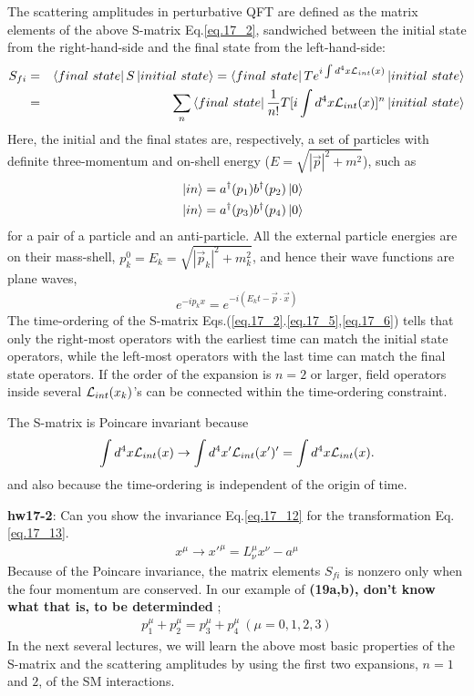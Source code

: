 \documentclass[12pt]{article}
\def\dgr{\dagger}
\begin{document}
  The scattering amplitudes in perturbative QFT are defined as the matrix
  elements of the above S-matrix Eq.\ref{eq.17_2}, sandwiched between the initial state from the right-hand-side and the final state from the left-hand-side:
\begin{eqnarray}
  S_{fi}
  &=& \bra{final~state} S \ket{initial~state}
  = \bra{final~state} T e^{ i\int d^4x {\cal L}_{int}(x) } \ket{initial~state} \\
  &=& \sum_n \bra{final~state} \frac{1}{n!}T[i\int d^4x {\cal L}_{int}(x)]^n \ket{initial~state} \label{eq.17_9}
\end{eqnarray}
  Here, the initial and the final states are, respectively, a set of
  particles with definite three-momentum and on-shell energy
  ($E = \sqrt{|{\vec p}|^2+m^2}$), such as
\begin{eqnarray}
  &&\ket {in}=a^\dgr(p_1) b^\dgr(p_2) \ket{0} \label{eq.17_10a} \\
  &&\ket {in}= a^\dgr(p_3) b^\dgr(p_4) \ket{0} \label{eq.17_10b} 
\end{eqnarray}
  for a pair of a particle and an anti-particle.  All the external particle
  energies are on their mass-shell, $p_k^0 = E_k = \sqrt{|{\vec p}_k|^2+m_k^2}$, and hence their wave functions are plane waves,
\begin{eqnarray}
  e^{ -ip_k x } = e^{ -i(E_k t - {\vec p}\cdot {\vec x}) } \label{eq.17_11}
\end{eqnarray}
  The time-ordering of the S-matrix Eqs.(\ref{eq.17_2}.\ref{eq.17_5},\ref{eq.17_6}) tells that only the right-most operators with the earliest time can match the initial state operators, while the left-most operators with the last time can match the final state operators. If the order of the expansion is $n=2$ or larger, field operators inside several ${\cal L}_{int}(x_k)$'s can be connected within the time-ordering constraint.

  The S-matrix is Poincare invariant because
\begin{eqnarray}
  \int d^4x {\cal L}_{int}(x) \to \int d^4x' {\cal L}_{int}(x')' = \int d^4x {\cal L}_{int}(x). \label{eq.17_12}
\end{eqnarray}
  and also because the time-ordering is independent of the origin of time.

{\bf hw17-2}: Can you show the invariance Eq.\ref{eq.17_12} for the transformation Eq.\ref{eq.17_13}.
\begin{eqnarray}
  x^\mu \to x'^\mu = L^\mu_\nu x^\nu - a^\mu \label{eq.17_13}
\end{eqnarray}
  Because of the Poincare invariance, the matrix elements $S_{fi}$ is
  nonzero only when the four momentum are conserved. In our example of
  {\bf (19a,b), don't know what that is, to be determinded} ;
\begin{eqnarray}
  p_1^\mu + p_2^\mu = p_3^\mu + p_4^\mu ~(\mu = 0,1,2,3) \label{eq.17_14}
\end{eqnarray}
  In the next several lectures, we will learn the above most basic
  properties of the S-matrix and the scattering amplitudes by using
  the first two expansions, $n=1$ and $2$, of the SM interactions.
\end{document}
